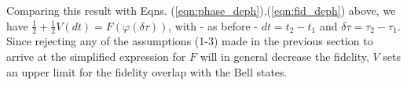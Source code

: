 Comparing this result with Eqns. (\ref{eqn:phase_deph}),(\ref{eqn:fid_deph}) above, we have $\frac{1}{2} + \frac{1}{2}V(dt)=F(\varphi(\delta\tau))$, with - as before - $dt=t_2-t_1$ and $\delta \tau = \tau_2-\tau_1$. Since rejecting any of the assumptions (1-3) made in the previous section to arrive at the simplified expression for $F$ will in general decrease the fidelity, $V$ sets an upper limit for the fidelity overlap with the Bell states.


\newpage




